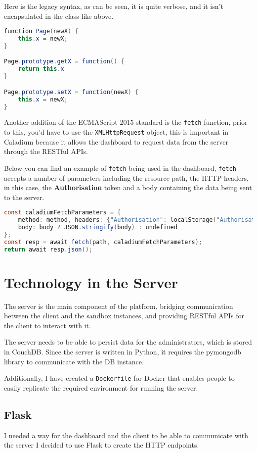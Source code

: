 Here is the legacy syntax, as can be seen, it is quite verbose,
and it isn't encapsulated in the class like above.

\begin{lstlisting}[language=Java]
function Page(newX) {
    this.x = newX;
}

Page.prototype.getX = function() {
    return this.x
}

Page.prototype.setX = function(newX) {
    this.x = newX;
}
\end{lstlisting}

Another addition of the ECMAScript 2015 standard is the \texttt{fetch} function,
prior to this, you'd have to use the \texttt{XMLHttpRequest} object,
this is important in Caladium because it allows the dashboard to
request data from the server through the RESTful APIs.

Below you can find an example of \texttt{fetch} being used in the dashboard,
\texttt{fetch} accepts a number of parameters including the resource path,
the HTTP headers, in this case, the \textbf{Authorisation}
token and a body containing the data being sent to the server.

\begin{lstlisting}[language=Java]
const caladiumFetchParameters = {
    method: method, headers: {"Authorisation": localStorage["Authorisation"]},
    body: body ? JSON.stringify(body) : undefined
};
const resp = await fetch(path, caladiumFetchParameters);
return await resp.json();
\end{lstlisting}

\section{Technology in the Server}
The server is the main component of the platform,
bridging communication between the client and the sandbox instances, 
and providing RESTful APIs for the client to interact with it.

The server needs to be able to persist data for the administrators, 
which is stored in CouchDB. Since the server is written in Python,
it requires the pymongodb library to communicate with the DB instance.

Additionally, I have created a \texttt{Dockerfile} for Docker
that enables people to easily replicate the required
environment for running the server.

\subsection{Flask}
I needed a way for the dashboard and the client to be
able to communicate with the server
I decided to use Flask to create the HTTP endpoints.

